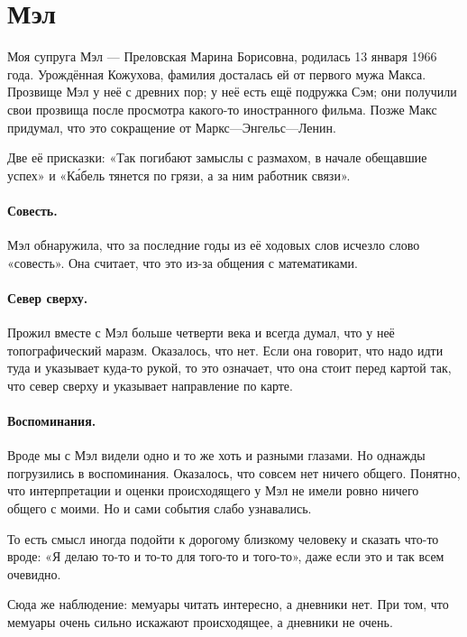 \documentclass{book}
\begin{document}

\section*{Мэл}

Моя супруга Мэл --- Преловская Марина Борисовна, родилась 13 января 1966 года.
Урождённая Кожухова, фамилия досталась ей от первого мужа Макса.
Прозвище Мэл у неё с древних пор;
у неё есть ещё подружка Сэм; они получили свои прозвища после просмотра какого-то иностранного фильма.
Позже Макс придумал, что это сокращение от Маркс---Энгельс---Ленин.

Две её присказки:
«Так погибают замыслы с размахом, в начале обещавшие успех»
и «К\'{а}бель тянется по грязи, а за ним работник связи».

\paragraph{Совесть.}
Мэл обнаружила, что за последние годы из её ходовых слов исчезло слово «совесть».
Она считает, что это из-за общения с математиками. 

\paragraph{Север сверху.}
Прожил вместе с Мэл больше четверти века и всегда думал, что у неё топографический маразм.
Оказалось, что нет.
Если она говорит, что надо идти туда и указывает куда-то рукой, то это означает, что она стоит перед картой так, что север сверху и указывает направление по карте.

\paragraph{Воспоминания.}
Вроде мы с Мэл видели одно и то же хоть и разными глазами.
Но однажды погрузились в воспоминания.
Оказалось, что совсем нет ничего общего.
Понятно, что интерпретации и оценки происходящего у Мэл не имели ровно ничего общего с моими.
Но и сами события слабо узнавались.

То есть смысл иногда подойти к дорогому близкому человеку и сказать что-то вроде: «Я делаю то-то и то-то для того-то и того-то», даже если это и так всем очевидно. 

Сюда же наблюдение: мемуары читать интересно, а дневники нет.
При том, что мемуары очень сильно искажают происходящее, а дневники не очень.
\end{document}
